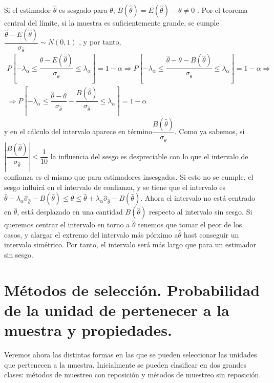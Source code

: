 Si el estimador $\hat{\theta}$ es sesgado para $\theta$, $B\left(\hat{\theta}\right)=E\left(\hat{\theta}\right)-\theta\neq0$
. Por el teorema central del l\'imite, si la muestra es suficientemente
grande, se cumple $\dfrac{\hat{\theta}-E\left(\hat{\theta}\right)}{\sigma_{\hat{\theta}}}\sim N\left(0,1\right)$
, y por tanto, $ $
\[
\begin{array}{c}
P\left[-\lambda_{\alpha}\leq\dfrac{\hat{\theta}-E\left(\hat{\theta}\right)}{\sigma_{\hat{\theta}}}\leq\lambda_{\alpha}\right]=1-\alpha\Rightarrow P\left[-\lambda_{\alpha}\leq\dfrac{\hat{\theta}-\theta-B\left(\hat{\theta}\right)}{\sigma_{\hat{\theta}}}\leq\lambda_{\alpha}\right]=1-\alpha\Rightarrow\\
\Rightarrow P\left[-\lambda_{\alpha}\leq\dfrac{\hat{\theta}-\theta}{\sigma_{\hat{\theta}}}-\dfrac{B\left(\hat{\theta}\right)}{\sigma_{\hat{\theta}}}\leq\lambda_{\alpha}\right]=1-\alpha
\end{array}
\]
 y en el c\'alculo del intervalo aparece en t\'ermino$\dfrac{B\left(\hat{\theta}\right)}{\sigma_{\hat{\theta}}}$.
Como ya sabemos, si $\left|\dfrac{B\left(\hat{\theta}\right)}{\sigma_{\hat{\theta}}}\right|<\dfrac{1}{10}$
la influencia del sesgo es despreciable con lo que el intervalo de
confianza es el mismo que para estimadores insesgados. Si esto no
se cumple, el sesgo influir\'a en el intervalo de confianza, y se tiene
que el intervalo es $\hat{\theta}-\lambda_{\alpha}\hat{\sigma}_{\hat{\theta}}-B\left(\hat{\theta}\right)\leq\theta\leq\hat{\theta}+\lambda_{\alpha}\hat{\sigma}_{\hat{\theta}}-B\left(\hat{\theta}\right)$.
Ahora el intervalo no est\'a centrado en $\hat{\theta}$, est\'a desplazado
en una cantidad $B\left(\hat{\theta}\right)$ respecto al intervalo
sin sesgo. Si queremos centrar el intervalo en torno a $\hat{\theta}$
tenemos que tomar el peor de los casos, y alargar el extremo del intervalo
m\'as p\'orximo a$\hat{\theta}$ hast conseguir un intervalo sim\'etrico.
Por tanto, el intervalo ser\'a m\'as largo que para un estimador sin sesgo.


\section{M\'etodos de selecci\'on. Probabilidad de la unidad de pertenecer a la
muestra y propiedades.}

Veremos ahora las distintas formas en las que se pueden seleccionar
las unidades que pertenecen a la muestra. Inicialmente se pueden clasificar
en dos grandes clases: m\'etodos de muestreo con reposici\'on y m\'etodos
de muestreo sin reposici\'on.

